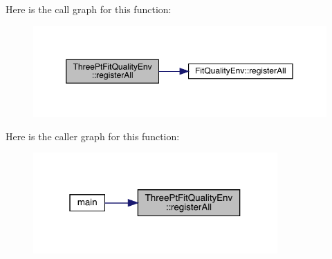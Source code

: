 Here is the call graph for this function\+:
\nopagebreak
\begin{figure}[H]
\begin{center}
\leavevmode
\includegraphics[width=350pt]{d6/d4e/namespaceThreePtFitQualityEnv_a5a11d85a380642b75077fec4406ef5af_cgraph}
\end{center}
\end{figure}
Here is the caller graph for this function\+:
\nopagebreak
\begin{figure}[H]
\begin{center}
\leavevmode
\includegraphics[width=265pt]{d6/d4e/namespaceThreePtFitQualityEnv_a5a11d85a380642b75077fec4406ef5af_icgraph}
\end{center}
\end{figure}

